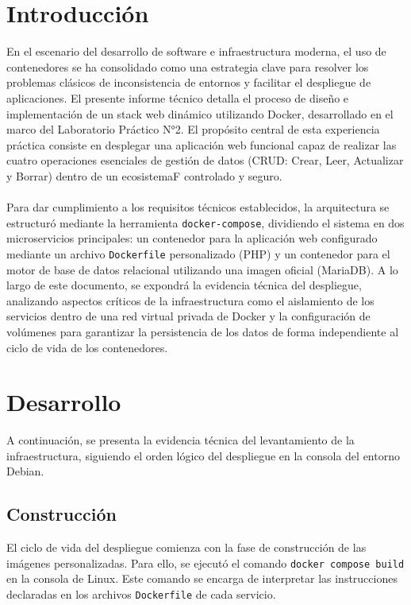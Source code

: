\chapter{Introducción}

En el escenario del desarrollo de software e infraestructura moderna, el uso de contenedores se ha consolidado como una estrategia clave para resolver los problemas clásicos de inconsistencia de entornos y facilitar el despliegue de aplicaciones. El presente informe técnico detalla el proceso de diseño e implementación de un stack web dinámico utilizando Docker, desarrollado en el marco del Laboratorio Práctico N°2. El propósito central de esta experiencia práctica consiste en desplegar una aplicación web funcional capaz de realizar las cuatro operaciones esenciales de gestión de datos (CRUD: Crear, Leer, Actualizar y Borrar) dentro de un ecosistemaF controlado y seguro.\\
\\
Para dar cumplimiento a los requisitos técnicos establecidos, la arquitectura se estructuró mediante la herramienta \texttt{docker-compose}, dividiendo el sistema en dos microservicios principales: un contenedor para la aplicación web configurado mediante un archivo \texttt{Dockerfile} personalizado (PHP) y un contenedor para el motor de base de datos relacional utilizando una imagen oficial (MariaDB). A lo largo de este documento, se expondrá la evidencia técnica del despliegue, analizando aspectos críticos de la infraestructura como el aislamiento de los servicios dentro de una red virtual privada de Docker y la configuración de volúmenes para garantizar la persistencia de los datos de forma independiente al ciclo de vida de los contenedores.

\chapter{Desarrollo}
A continuación, se presenta la evidencia técnica del levantamiento de la infraestructura, siguiendo el orden lógico del despliegue en la consola del entorno Debian.

\section{Construcción}
El ciclo de vida del despliegue comienza con la fase de construcción de las imágenes personalizadas. Para ello, se ejecutó el comando \texttt{docker compose build} en la consola de Linux. Este comando se encarga de interpretar las instrucciones declaradas en los archivos \texttt{Dockerfile} de cada servicio.

